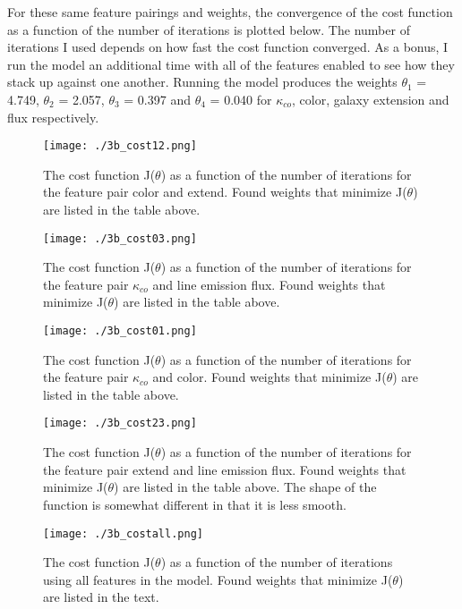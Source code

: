 For these same feature pairings and weights, the convergence of the cost function as a function of the number of iterations is plotted below. The number of iterations I used depends on how fast the cost function converged. As a bonus, I run the model an additional time with all of the features enabled to see how they stack up against one another. Running the model produces the weights $\theta_1$ = 4.749, $\theta_2$ = 2.057, $\theta_3$ = 0.397 and $\theta_4$ = 0.040 for $\kappa_{co}$, color, galaxy extension and flux respectively. 

\begin{figure}[h!]
  \centering
  \texttt{[image: ./3b\_cost12.png]}
  \caption{The cost function J($\theta$) as a function of the number of iterations for the feature pair color and extend. Found weights that minimize J($\theta$) are listed in the table above.}
\end{figure}

\begin{figure}[h!]
  \centering
  \texttt{[image: ./3b\_cost03.png]}
  \caption{The cost function J($\theta$) as a function of the number of iterations for the feature pair $\kappa_{co}$ and line emission flux. Found weights that minimize J($\theta$) are listed in the table above.}
\end{figure}

\begin{figure}[h!]
  \centering
  \texttt{[image: ./3b\_cost01.png]}
  \caption{The cost function J($\theta$) as a function of the number of iterations for the feature pair $\kappa_{co}$ and color. Found weights that minimize J($\theta$) are listed in the table above.}
\end{figure}

\begin{figure}[h!]
  \centering
  \texttt{[image: ./3b\_cost23.png]}
  \caption{The cost function J($\theta$) as a function of the number of iterations for the feature pair extend and line emission flux. Found weights that minimize J($\theta$) are listed in the table above. The shape of the function is somewhat different in that it is less smooth.}
\end{figure}

\begin{figure}[h!]
  \centering
  \texttt{[image: ./3b\_costall.png]}
  \caption{The cost function J($\theta$) as a function of the number of iterations using all features in the model. Found weights that minimize J($\theta$) are listed in the text.}
\end{figure}

